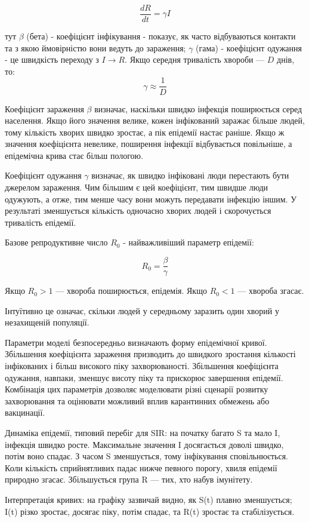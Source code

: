 $$
\frac{dR}{dt} = \gamma I
$$

тут $\beta$ (бета) - коефіцієнт інфікування - показує, як часто відбуваються контакти та з якою ймовірністю вони ведуть до зараження; $\gamma$ (гама) - коефіцієнт одужання - це швидкість переходу з $I \rightarrow R$. Якщо середня тривалість хвороби — $D$ днів, то:
  $$
  \gamma \approx \frac{1}{D}
  $$

Коефіцієнт зараження $\beta$ визначає, наскільки швидко інфекція поширюється серед населення. Якщо його значення велике, кожен інфікований заражає більше людей, тому кількість хворих швидко зростає, а пік епідемії настає раніше. Якщо ж значення коефіцієнта невелике, поширення інфекції відбувається повільніше, а епідемічна крива стає більш пологою.

Коефіцієнт одужання $\gamma$ визначає, як швидко інфіковані люди перестають бути джерелом зараження. Чим більшим є цей коефіцієнт, тим швидше люди одужують, а отже, тим менше часу вони можуть передавати інфекцію іншим. У результаті зменшується кількість одночасно хворих людей і скорочується тривалість епідемії.

Базове репродуктивне число $R_0$ - найважливіший параметр епідемії:

$$
R_0 = \frac{\beta}{\gamma}
$$

Якщо $R_0 > 1$ — хвороба поширюється, епідемія. Якщо $R_0 < 1$ — хвороба згасає.

Інтуїтивно це означає, скільки людей у середньому заразить один хворий у незахищеній популяції.

Параметри моделі безпосередньо визначають форму епідемічної кривої. Збільшення коефіцієнта зараження призводить до швидкого зростання кількості інфікованих і більш високого піку захворюваності. Збільшення коефіцієнта одужання, навпаки, зменшує висоту піку та прискорює завершення епідемії. Комбінація цих параметрів дозволяє моделювати різні сценарії розвитку захворювання та оцінювати можливий вплив карантинних обмежень або вакцинації.

Динаміка епідемії, типовий перебіг для SIR: на початку багато S та мало I, інфекція швидко росте. Максимальне значення I досягається доволі швидко, потім воно спадає. З часом S зменшується, тому інфікування сповільнюється. Коли кількість сприйнятливих падає нижче певного порогу, хвиля епідемії природно згасає. Збільшується група R — тих, хто набув імунітету.

Інтерпретація кривих: на графіку зазвичай видно, як S(t) плавно зменшується; I(t) різко зростає, досягає піку, потім спадає, та R(t) зростає та стабілізується.

